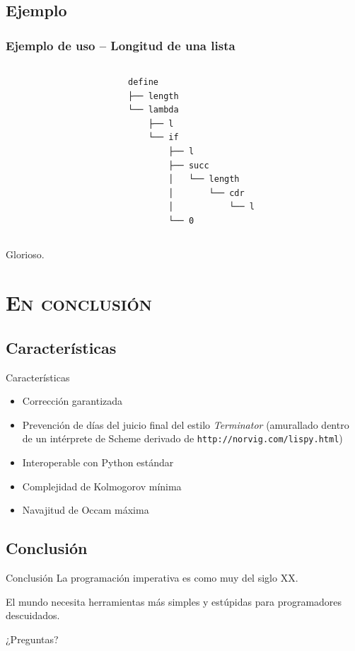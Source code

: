 \documentclass[xcolor=x11names,compress]{beamer}
\renewcommand{\(}{\begin{columns}}
\renewcommand{\)}{\end{columns}}
\newcommand{\<}[1]{\begin{column}{#1}}
\renewcommand{\>}{\end{column}}
\begin{document}
\subsection{Ejemplo}
\begin{frame}[fragile]
    \frametitle{Ejemplo de uso -- Longitud de una lista}
    \begin{columns}
        \begin{column}{.50\linewidth}
        \begin{block}
            \codeLengthExampleC
        \end{block}
        \end{column}\pause
        \begin{column}{.50\linewidth}
        \begin{verbatim}
define
├── length
└── lambda
    ├── l
    └── if
        ├── l
        ├── succ
        │   └── length
        │       └── cdr
        │           └── l
        └── 0
        \end{verbatim}
        \end{column}
    \end{columns} \pause

    Glorioso.
\end{frame}

\section{\scshape En conclusión}
\subsection{Características}
\begin{frame}{Características}
    \begin{itemize}
        \item Corrección garantizada \pause
            \begin{block}
                \codeImpossible
            \end{block} \pause
        \item Prevención de días del juicio final del estilo \emph{Terminator}
            (amurallado dentro de un intérprete de Scheme derivado de \texttt{http://norvig.com/lispy.html})\pause
        \item Interoperable con Python estándar \pause
        \item Complejidad de Kolmogorov mínima \pause
        \item Navajitud de Occam máxima
    \end{itemize}
\end{frame}

\subsection{Conclusión}
\begin{frame}{Conclusión}
    La programación imperativa es como muy del siglo XX. \pause

    El mundo necesita herramientas más simples y estúpidas 
    para programadores descuidados.\pause

    \vspace{1in}

    {\Large ¿Preguntas?}
\end{frame}
\end{document}
